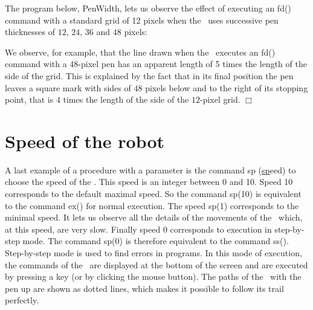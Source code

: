 \begin{exemple}{\rm
The program below, {\idt PenWidth}, lets us observe
 the effect of executing an {\idt fd()} command with a
 standard grid of 12 pixels when the \robot\ uses successive pen
 thicknesses of $12$, $24$, $36$ and $48$
 pixels:\par\nopagebreak
\noindent\begin{minipage}[t][6.4cm][t]{\linewidth}
\vspace*{6cm}%
%
\vspace*{-6cm}%

\end{minipage}
We observe, for example, that the line drawn when the \robot\ executes
an {\idt fd()} command with a 48-pixel pen has an
apparent length of 5 times the length of the side of the grid. This
is explained by the fact that in its final position the pen leaves a
square mark with sides of $48$ pixels below and to the right of its stopping point,
that is $4$ times the length of the side of the $12$-pixel grid.
$\Box$ }%
\end{exemple}

\section{Speed of the robot}

A last example of a procedure with a parameter is the command {\idt sp} (\underline{sp}eed) to choose
the speed of the \robot. This speed is an integer between
0 and 10. Speed 10 corresponds to the default maximal speed. So the command {\idt sp(10)}
is equivalent to the command {\idt ex()} for normal execution. The speed
{\idt sp(1)} corresponds to the minimal speed. It lets us observe all the details of the
movements of the \robot\ which, at this speed, are very slow. Finally speed 0
corresponds to execution in step-by-step mode. The command {\idt sp(0)} is therefore equivalent
to the command {\idt ss()}. Step-by-step mode is used to find errors in
programs. In this mode of execution, the commands of the \robot\ are displayed at the bottom of the screen
and are executed by pressing a key (or by clicking the mouse button). The paths
of the \robot\ with the pen up are shown as dotted lines, which makes it possible to follow
its trail perfectly.

